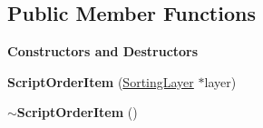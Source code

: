 \subsection*{Public Member Functions}
\begin{Indent}\textbf{ Constructors and Destructors}\par
\begin{DoxyCompactItemize}
\item 
\mbox{\label{classrev_1_1_view_1_1_script_order_item_a851dc2d390454e2f9bc7071f8717c2cd}} 
{\bfseries Script\+Order\+Item} (\mbox{\hyperlink{structrev_1_1_sorting_layer}{Sorting\+Layer}} $\ast$layer)
\item 
\mbox{\label{classrev_1_1_view_1_1_script_order_item_ae099dfccd03afd9b574b4c5130309202}} 
{\bfseries $\sim$\+Script\+Order\+Item} ()
\end{DoxyCompactItemize}
\end{Indent}
